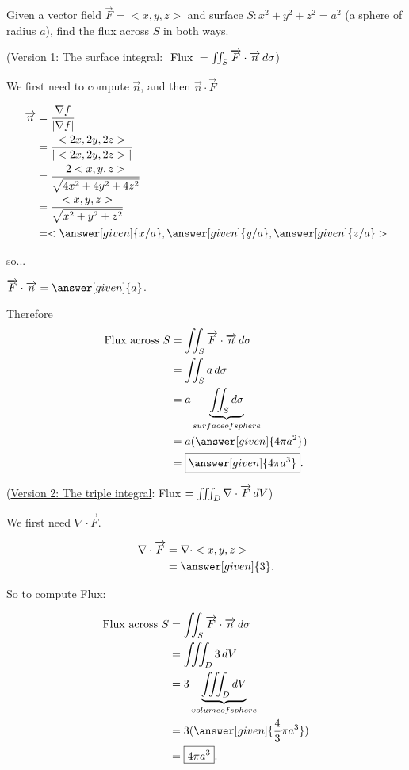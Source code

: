 \documentclass{ximera}
\begin{document}
\begin{example}
Given a vector field $\overrightarrow{F} = <x,y,z>$ and surface $S: x^2 + y^2 + z^2 = a^2$ (a sphere of radius $a$), find the flux across $S$ in both ways.

\begin{explanation}
(\underline{Version 1: The surface integral:} $\text{ Flux } = \iint_S \overrightarrow{F} \cdot \overrightarrow{n} \mathop{}\!d \sigma$)

We first need to compute $\overrightarrow{n}$, and then $\overrightarrow{n}\cdot \overrightarrow{F}$

    \begin{align*}
     \overrightarrow{n} &= \frac{\nabla f}{|\nabla f|} \\
    &= \frac{<2x, 2y, 2z>}{|<2x,2y,2z>|} \\
    &= \frac{2<x,y,z>}{\sqrt{4x^2 + 4y^2 +4z^2}} \\
    &= \frac{<x,y,z>}{\sqrt{x^2 + y^2 + z^2}} \\
    &= <\answer[given]{x/a}, \answer[given]{y/a},     \answer[given]{z/a}>
    \end{align*}

so... 

$\overrightarrow{F} \cdot \overrightarrow{n} = \answer[given]{a}$.

Therefore 
    \begin{align*}
     \text{Flux across }S &= \iint_S \overrightarrow{F} \cdot \overrightarrow{n} \d \sigma \\
    &= \iint_S a \d \sigma \\
    &= a \underbrace{\iint_S \d \sigma}_{surface of sphere} \\
    &= a(\answer[given]{4 \pi a^2}) \\
    &= \boxed{\answer[given]{4 \pi a^3}}.
    \end{align*}

\end{explanation}

\begin{explanation}
(\underline{Version 2: The triple integral}: Flux $=  \iiint_D \nabla \cdot \overrightarrow{F} \mathop{}\!d V$)

We first need $\nabla \cdot \overrightarrow{F}$.

    \begin{align*}
     \nabla \cdot  \overrightarrow{F} &= \nabla \cdot <x,y,z> \\
    &= \answer[given]{3}.
    \end{align*}

So to compute Flux:

    \begin{align*}
     \text{Flux across }S &= \iint_S \overrightarrow{F} \cdot \overrightarrow{n} \d \sigma \\
    &= \iiint_D 3 \d V \\
    &= 3 \underbrace{\iiint_D \d V}_{volume of sphere} \\
    &= 3(\answer[given]{\frac{4}{3} \pi a^3}) \\
    &= \boxed{4 \pi a^3}.
    \end{align*}
\end{explanation}
\end{example}
\end{document}
